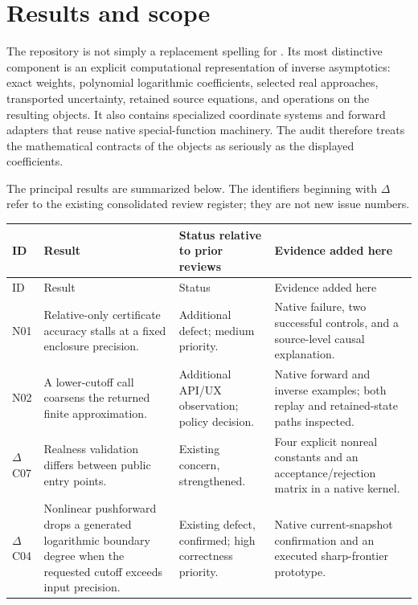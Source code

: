 \documentclass[11pt,letterpaper]{article}
\newcommand{\code}[1]{\texttt{\detokenize{#1}}}
\begin{document}
\tableofcontents
\newpage

\section{Results and scope}
\label{sec:results}
The repository is not simply a replacement spelling for \code{Series}. Its most distinctive component is an explicit computational representation of inverse asymptotics: exact weights, polynomial logarithmic coefficients, selected real approaches, transported uncertainty, retained source equations, and operations on the resulting objects. It also contains specialized coordinate systems and forward adapters that reuse native special-function machinery. The audit therefore treats the mathematical contracts of the objects as seriously as the displayed coefficients.\cite{repo-readme,repo-core,repo-ops,repo-native}

The principal results are summarized below. The identifiers beginning with $\Delta$ refer to the existing consolidated review register; they are not new issue numbers.

\begin{longtable}{@{}p{}p{}p{}p{}@{}}
\toprule
ID & Result & Status relative to prior reviews & Evidence added here\\
\midrule\endfirsthead
\toprule ID & Result & Status & Evidence added here\\\midrule\endhead
N01 & Relative-only certificate accuracy stalls at a fixed enclosure precision. & Additional defect; medium priority. & Native failure, two successful controls, and a source-level causal explanation.\\[6pt]
N02 & A lower-cutoff \code{SeriesRefine} call coarsens the returned finite approximation. & Additional API/UX observation; policy decision. & Native forward and inverse examples; both replay and retained-state paths inspected.\\[6pt]
$\Delta$C07 & Realness validation differs between public entry points. & Existing concern, strengthened. & Four explicit nonreal constants and an acceptance/rejection matrix in a native kernel.\\[6pt]
$\Delta$C04 & Nonlinear pushforward drops a generated logarithmic boundary degree when the requested cutoff exceeds input precision. & Existing defect, confirmed; high correctness priority. & Native current-snapshot confirmation and an executed sharp-frontier prototype.\\
\bottomrule
\end{longtable}
\end{document}
